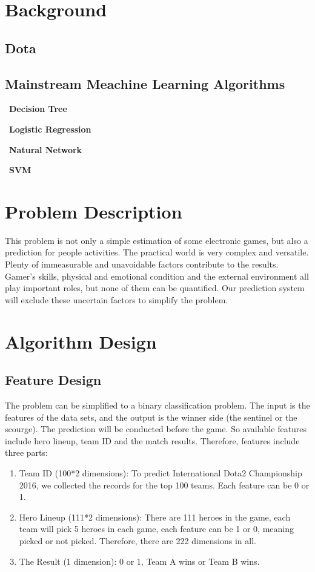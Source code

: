 \documentclass{article}
\begin{document}
\section{Background}
\subsection{Dota}
\subsection{Mainstream Meachine Learning Algorithms}
~\textbf{Decision Tree}

~\textbf{Logistic Regression}

~\textbf{Natural Network}

~\textbf{SVM}

\section{Problem Description}
This problem is not only a simple estimation of some electronic games, but also a prediction for people activities. The practical world is very complex and versatile. Plenty of immeasurable and unavoidable factors contribute to the results. Gamer’s skills, physical and emotional condition and the external environment all play important roles, but none of them can be quantified. Our prediction system will exclude these uncertain factors to simplify the problem.

\section{Algorithm Design}
\subsection{Feature Design}
The problem can be simplified to a binary classification problem. The input is the features of the data sets, and the output is the winner side (the sentinel or the scourge). The prediction will be conducted before the game. So available features include hero lineup, team ID and the match results.  Therefore, features include three parts: 
\begin{enumerate}
\item Team ID (100*2 dimensions): To predict International Dota2 Championship 2016, we collected the records for the top 100 teams. Each feature can be 0 or 1.
\item Hero Lineup (111*2 dimensions): There are 111 heroes in the game, each team will pick 5 heroes in each game, each feature can be 1 or 0, meaning picked or not picked. Therefore, there are 222 dimensions in all.
\item The Result (1 dimension): 0 or 1, Team A wins or Team B wins.
\end{enumerate}
\end{document}
